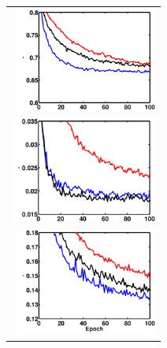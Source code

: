 \documentclass[11pt]{article}
\newcommand{\picwidth}{1.84in}
\begin{document}
\begin{figure}[t]
{\begin{tabular}{r}
   \includegraphics[width=\picwidth]{drop-cifar100-test.pdf} \\
   \includegraphics[width=1.9in]{drop-mnist-test.pdf} \\
   \includegraphics[width=\picwidth]{drop-svhn-test.pdf}
  \end{tabular}
 }
 

\end{figure}
\end{document}
